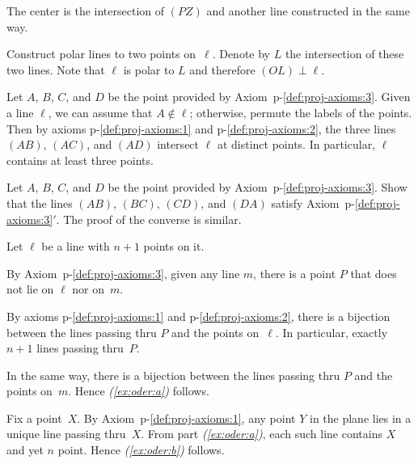 The center is the intersection of $(PZ)$ and another line constructed in the same way.

Construct polar lines to two points on~$\ell$.
Denote by $L$ the intersection of these two lines.
Note that $\ell$ is polar to $L$ and therefore $(OL)\perp \ell$.

Let $A$, $B$, $C$, and $D$ 
be the point provided by Axiom~p-\ref{def:proj-axioms:3}.
Given a line $\ell$, we can assume that $A\notin \ell$; 
otherwise, permute the labels of the points.
Then by axioms p-\ref{def:proj-axioms:1} and p-\ref{def:proj-axioms:2},
the three lines $(AB)$, $(AC)$, and $(AD)$ intersect $\ell$ at distinct points.
In particular, $\ell$ contains at least three points. 

Let $A$, $B$, $C$, and $D$ 
be the point provided by Axiom~p-\ref{def:proj-axioms:3}.
Show that the lines $(AB)$, $(BC)$, $(CD)$, and $(DA)$
satisfy Axiom~p-\ref{def:proj-axioms:3}$'$.
The proof of the converse is similar.

Let $\ell$ be a line with $n+1$ points on it.

By Axiom~p-\ref{def:proj-axioms:3}, given any line $m$, there is a point $P$ that does not lie on $\ell$ nor on~$m$.

By axioms p-\ref{def:proj-axioms:1} and p-\ref{def:proj-axioms:2}, there is a bijection between the lines passing thru $P$ and the points on~$\ell$.
In particular, exactly $n+1$ lines passing thru~$P$.

In the same way, there is a bijection between the lines passing thru $P$ and the points on~$m$. 
Hence \textit{(\ref{ex:oder:a})} follows.

Fix a point~$X$.
By Axiom~p-\ref{def:proj-axioms:1}, any point $Y$ in the plane lies in a unique line passing thru~$X$.
From part \textit{(\ref{ex:oder:a})}, each such line contains $X$ and yet $n$ point.
Hence \textit{(\ref{ex:oder:b})} follows.

